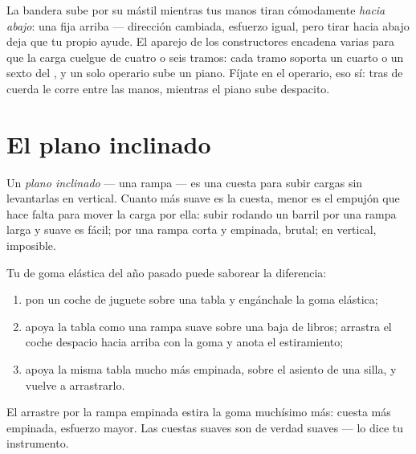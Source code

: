 \begin{example}\label{ex:g5:simple-machines:pulleywork}
La bandera sube por su mástil mientras tus manos tiran cómodamente
\emph{hacia abajo}: una  fija arriba --- dirección cambiada,
esfuerzo igual, pero tirar hacia abajo deja que tu propio 
ayude. El aparejo de los constructores encadena varias  para
que la carga cuelgue de cuatro o seis tramos: cada tramo soporta un
cuarto o un sexto del , y un solo operario sube un piano. Fíjate
en el operario, eso sí:  tras  de cuerda le corre entre
las manos, mientras el piano sube despacito.
\end{example}

\section{El plano inclinado}

\begin{definition}\label{def:g5:simple-machines:ramp}
Un \emph{plano inclinado} --- una rampa --- es
una cuesta para subir cargas sin levantarlas en vertical. Cuanto más
suave es la cuesta, menor es el empujón que hace falta para mover la
carga por ella: subir rodando un barril por una rampa larga y suave es
fácil; por una rampa corta y empinada, brutal; en vertical, imposible.
\end{definition}

\begin{method}\label{met:g5:simple-machines:measure}
Tu  de goma elástica del año pasado puede saborear la
diferencia:
\begin{enumerate}
  \item pon un coche de juguete sobre una tabla y engánchale la goma
        elástica;
  \item apoya la tabla como una rampa suave sobre una  baja de
        libros; arrastra el coche despacio hacia arriba con la goma y
        anota el estiramiento;
  \item apoya la misma tabla mucho más empinada, sobre el asiento de
        una silla, y vuelve a arrastrarlo.
\end{enumerate}
El arrastre por la rampa empinada estira la goma muchísimo más: cuesta
más empinada, esfuerzo mayor. Las cuestas suaves son de verdad suaves
--- lo dice tu instrumento.
\end{method}

